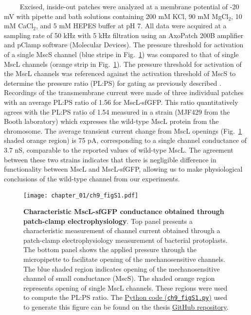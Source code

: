 \documentclass[12pt]{caltech_thesis}
\begin{document}
~~~~ Excised, inside-out patches were analyzed at a membrane potential
of -20 mV with pipette and bath solutions containing 200 mM KCl, 90 mM
MgCl\(_2\), 10 mM CaCl\(_2\), and 5 mM HEPES buffer at pH 7. All data
were acquired at a sampling rate of 50 kHz with 5 kHz filtration using
an AxoPatch 200B amplifier and pClamp software (Molecular Devices). The
pressure threshold for activation of a single MscS channel (blue stripe
in Fig.~\ref{fig:ephys}) was compared to that of single MscL channels
(orange strip in Fig.~\ref{fig:ephys}). The pressure threshold for
activation of the MscL channels was referenced against the activation
threshold of MscS to determine the pressure ratio (PL:PS) for gating as
previously described \autocite{blount1996}. Recordings of the
transmembrane current were made of three individual patches with an
average PL:PS ratio of 1.56 for MscL-sfGFP. This ratio quantitatively
agrees with the PL:PS ratio of 1.54 measured in a strain (MJF429 from
the Booth laboratory) which expresses the wild-type MscL protein from
the chromosome. The average transient current change from MscL openings
(Fig.~\ref{fig:ephys} shaded orange region) is 75 pA, corresponding to a
single channel conductance of 3.7 nS, comparable to the reported values
of wild-type MscL. The agreement between these two strains indicates
that there is negligible difference in functionality between MscL and
MscL-sfGFP, allowing us to make physiological conclusions of the
wild-type channel from our experiments.

\hypertarget{fig:ephys}{%
\begin{figure}
\centering
\texttt{[image: chapter\_01/ch9\_figS1.pdf]}
\caption[{Characteristic MscL-sfGFP conductance obtained through
patch-clamp electrophysiology}]{\textbf{Characteristic MscL-sfGFP
conductance obtained through patch-clamp electrophysiology}. Top panel
presents a characteristic measurement of channel current obtained
through a patch-clamp electrophysiology measurement of bacterial
protoplasts. The bottom panel shows the applied pressure through the
micropipette to facilitate opening of the mechanosensitive channels. The
blue shaded region indicates opening of the mechanosensitive channel of
small conductance (MscS). The shaded orange region represents opening of
single MscL channels. These regions were used to compute the PL:PS
ratio. The
\href{https://github.com/gchure/phd/blob/master/src/chapter_09/code/ch9_figS1.py}{Python
code (\texttt{ch9\_figS1.py})} used to generate this figure can be found
on the thesis \href{https://github.com/gchure/phd}{GitHub repository}.}
\label{fig:ephys}
\end{figure}
}
\end{document}
